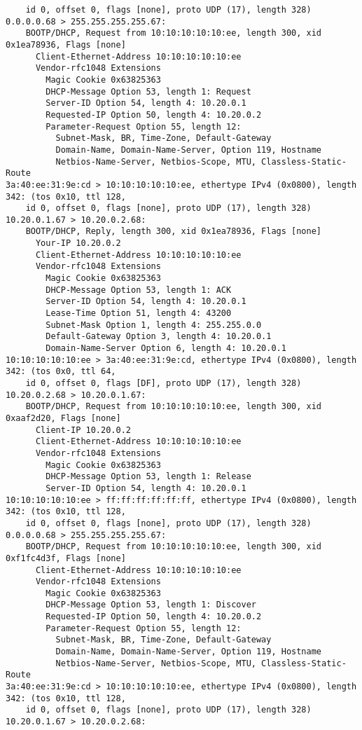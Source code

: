 \documentclass[a4paper,12pt]{article}
\begin{document}
\begin{Verbatim}
	id 0, offset 0, flags [none], proto UDP (17), length 328) 0.0.0.0.68 > 255.255.255.255.67:
	BOOTP/DHCP, Request from 10:10:10:10:10:ee, length 300, xid 0x1ea78936, Flags [none]
	  Client-Ethernet-Address 10:10:10:10:10:ee
	  Vendor-rfc1048 Extensions
	    Magic Cookie 0x63825363
	    DHCP-Message Option 53, length 1: Request
	    Server-ID Option 54, length 4: 10.20.0.1
	    Requested-IP Option 50, length 4: 10.20.0.2
	    Parameter-Request Option 55, length 12:
	      Subnet-Mask, BR, Time-Zone, Default-Gateway
	      Domain-Name, Domain-Name-Server, Option 119, Hostname
	      Netbios-Name-Server, Netbios-Scope, MTU, Classless-Static-Route
3a:40:ee:31:9e:cd > 10:10:10:10:10:ee, ethertype IPv4 (0x0800), length 342: (tos 0x10, ttl 128,
	id 0, offset 0, flags [none], proto UDP (17), length 328) 10.20.0.1.67 > 10.20.0.2.68:
	BOOTP/DHCP, Reply, length 300, xid 0x1ea78936, Flags [none]
	  Your-IP 10.20.0.2
	  Client-Ethernet-Address 10:10:10:10:10:ee
	  Vendor-rfc1048 Extensions
	    Magic Cookie 0x63825363
	    DHCP-Message Option 53, length 1: ACK
	    Server-ID Option 54, length 4: 10.20.0.1
	    Lease-Time Option 51, length 4: 43200
	    Subnet-Mask Option 1, length 4: 255.255.0.0
	    Default-Gateway Option 3, length 4: 10.20.0.1
	    Domain-Name-Server Option 6, length 4: 10.20.0.1
10:10:10:10:10:ee > 3a:40:ee:31:9e:cd, ethertype IPv4 (0x0800), length 342: (tos 0x0, ttl 64,
	id 0, offset 0, flags [DF], proto UDP (17), length 328) 10.20.0.2.68 > 10.20.0.1.67:
	BOOTP/DHCP, Request from 10:10:10:10:10:ee, length 300, xid 0xaaf2d20, Flags [none]
	  Client-IP 10.20.0.2
	  Client-Ethernet-Address 10:10:10:10:10:ee
	  Vendor-rfc1048 Extensions
	    Magic Cookie 0x63825363
	    DHCP-Message Option 53, length 1: Release
	    Server-ID Option 54, length 4: 10.20.0.1
10:10:10:10:10:ee > ff:ff:ff:ff:ff:ff, ethertype IPv4 (0x0800), length 342: (tos 0x10, ttl 128,
	id 0, offset 0, flags [none], proto UDP (17), length 328) 0.0.0.0.68 > 255.255.255.255.67:
	BOOTP/DHCP, Request from 10:10:10:10:10:ee, length 300, xid 0xf1fc4d3f, Flags [none]
	  Client-Ethernet-Address 10:10:10:10:10:ee
	  Vendor-rfc1048 Extensions
	    Magic Cookie 0x63825363
	    DHCP-Message Option 53, length 1: Discover
	    Requested-IP Option 50, length 4: 10.20.0.2
	    Parameter-Request Option 55, length 12:
	      Subnet-Mask, BR, Time-Zone, Default-Gateway
	      Domain-Name, Domain-Name-Server, Option 119, Hostname
	      Netbios-Name-Server, Netbios-Scope, MTU, Classless-Static-Route
3a:40:ee:31:9e:cd > 10:10:10:10:10:ee, ethertype IPv4 (0x0800), length 342: (tos 0x10, ttl 128,
	id 0, offset 0, flags [none], proto UDP (17), length 328) 10.20.0.1.67 > 10.20.0.2.68:

\end{Verbatim}
\end{document}
